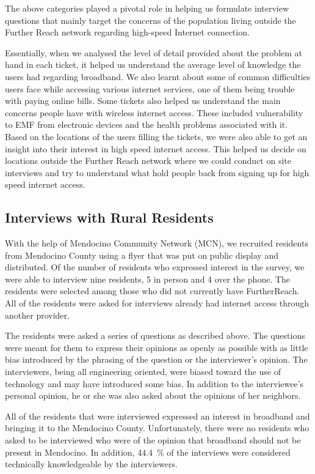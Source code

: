 The above categories played a pivotal role in helping us formulate interview questions that mainly target the concerns of the population living outside the Further Reach network regarding high-speed Internet connection.

Essentially, when we analysed the level of detail provided about the problem
at hand in each ticket, it helped us understand the average level of knowledge
the users had regarding broadband. We also learnt about some of common
difficulties users face while accessing various internet services, one of them
being trouble with paying online bills. Some tickets also helped us understand
the main concerns people have with wireless internet access. These included
vulnerability to EMF from electronic devices and the health problems
associated with it. Based on the locations of the users filling the tickets,
we were also able to get an insight into their interest in high speed internet
access. This helped us decide on locations outside the Further Reach network
where we could conduct on site interviews and try to understand what hold
people back from signing up for high speed internet access. 

\subsection{Interviews with Rural Residents}
\label{sec:interv-with-rural}

With the help of Mendocino Community Network (MCN), we recruited 
residents from Mendocino County using a flyer that was put on public display and distributed.
Of the number of residents who expressed interest in the survey, we were able to interview
nine residents, 5 in person and 4 over the phone. The residents were selected among those
who did not currently have FurtherReach. All of the residents were asked for interviews
already had internet access through another provider.

The residents were asked a series of questions as described above. The questions were meant for
them to express their opinions as openly as possible with as little bias introduced by the
phrasing of the question or the interviewer's opinion. The interviewers, being all engineering
oriented, were biased toward the use of technology and may have introduced some bias. In addition
to the interviewee's personal opinion, he or she was also asked about the opinions of her
neighbors.

All of the residents that were interviewed expressed an interest in broadband and bringing it
to the Mendocino County. Unfortunately, there were no residents who asked to be interviewed who 
were of the opinion that broadband should not be present in Mendocino. In addition, 44.4~\% of
the interviews were considered technically knowledgeable by the interviewers.

